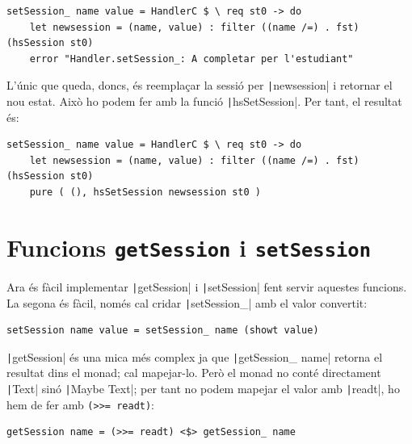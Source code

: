 \documentclass[catalan, a4paper]{scrartcl}
\newcommand{\haskellfunc}[1]{\texorpdfstring{\texttt{#1}}{#1}}
\begin{document}
\begin{verbatim}
setSession_ name value = HandlerC $ \ req st0 -> do
    let newsession = (name, value) : filter ((name /=) . fst) (hsSession st0)
    error "Handler.setSession_: A completar per l'estudiant"
\end{verbatim}

L'únic que queda, doncs, és reemplaçar la sessió per \texttt|newsession|
i retornar el nou estat. Això ho podem fer amb la funció \texttt|hsSetSession|.
Per tant, el resultat és:

\begin{verbatim}
setSession_ name value = HandlerC $ \ req st0 -> do
    let newsession = (name, value) : filter ((name /=) . fst) (hsSession st0)
    pure ( (), hsSetSession newsession st0 )
\end{verbatim}

\section{Funcions \haskellfunc{getSession} i \haskellfunc{setSession}}

Ara és fàcil implementar \texttt|getSession| i \texttt|setSession|
fent servir aquestes funcions. La segona és fàcil, només cal cridar \texttt|setSession_|
amb el valor convertit:

\begin{verbatim}
setSession name value = setSession_ name (showt value)
\end{verbatim}

\texttt|getSession| és una mica més complex ja que \texttt|getSession_ name|
retorna el resultat dins el monad; cal mapejar-lo. Però el monad no conté
directament \texttt|Text| sinó \texttt|Maybe Text|;
per tant no podem mapejar el valor amb \texttt|readt|, ho hem de fer amb \texttt{(>>= readt)}:

\begin{verbatim}
getSession name = (>>= readt) <$> getSession_ name
\end{verbatim}
\end{document}
